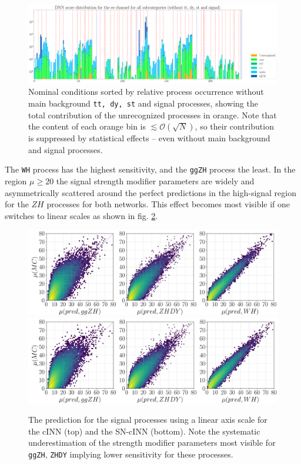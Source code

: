 	\begin{figure}[h!]
		\centering
		\includegraphics[width=\linewidth]{figures/inference/cond4_sorted_no_main_bkg_no_sig.pdf}
		\caption{Nominal conditions sorted by relative process occurrence without main background \texttt{tt, dy, st} and signal processes, showing the total contribution of the unrecognized processes in orange. Note that the content of each orange bin is $\lesssim\mathcal{O}(\sqrt{N})$, so their contribution is suppressed by statistical effects -- even without main background and signal processes.}
		\label{fig:cond_without_sig_bkg}
	\end{figure}

The \texttt{WH} process has the highest sensitivity, and the \texttt{ggZH} process the least. In the region $\mu\geq20$ the signal strength modifier parameters are widely and asymmetrically scattered around the perfect predictions in the high-signal region for the $ZH$ processes for both networks. This effect becomes most visible if one switches to linear scales as shown in fig. \ref{fig:predictions_sig_lin}. 

\begin{figure}[h]
	\centering
	\includegraphics[width=\linewidth]{figures/inference/p_lin}
	\includegraphics[width=\linewidth]{figures/inference/p_lin_SN}
	\caption{The prediction for the signal processes using a linear axis scale for the cINN (top) and the SN-cINN (bottom). Note the systematic underestimation of the strength modifier parameters most visible for \texttt{ggZH}, \texttt{ZHDY} implying lower sensitivity for these processes.}
	\label{fig:predictions_sig_lin}
\end{figure}

